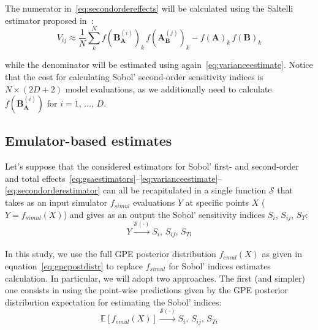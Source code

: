 \noindent
The numerator in~\eqref{eq:secondordereffects} will be calculated using the Saltelli estimator proposed in~\cite{Saltelli:2002}:
%
\begin{equation}\label{eq:secondorderestimator}
   V_{ij} \approx \frac{1}{N}\sum_{k}^{N}f(\mathbf{B}_{\mathbf{A}}^{(i)})_k\,f(\mathbf{A}_{\mathbf{B}}^{(j)})_k - f(\mathbf{A})_k\,f(\mathbf{B})_k
\end{equation}

\noindent
while the denominator will be estimated using again~\eqref{eq:varianceestimate}. Notice that the cost for calculating Sobol' second-order sensitivity indices is $N\times (2D + 2)$ model evaluations, as we additionally need to calculate $f(\mathbf{B}_{\mathbf{A}}^{(i)})$ for $i=1,\,\dots,\,D$.


%
%
%
\subsection{Emulator-based estimates}\label{sec:ch3emulatorbasedestimates}
Let's suppose that the considered estimators for Sobol' first- and second-order and total effects~\eqref{eq:gsaestimators}--\eqref{eq:varianceestimate}--\eqref{eq:secondorderestimator} can all be recapitulated in a single function $\mathcal{S}$ that takes as an input simulator $f_{simul}$ evaluations $Y$ at specific points $X$ ($Y=f_{simul}(X)$) and gives as an output the Sobol' sensitivity indices $S_i,\,S_{ij},\,S_{T}$:
%
\begin{equation}\label{eq:modelevalsgsa}
    Y\xrightarrow[]{\mathcal{S}(\cdot)} S_i,\,S_{ij},\,S_{Ti}
\end{equation}

\noindent
In this study, we use the full GPE posterior distribution $f_{emul}(X)$ as given in equation~\eqref{eq:gpepostdistr} to replace $f_{simul}$ for Sobol' indices estimates calculation. In particular, we will adopt two approaches. The first (and simpler) one consists in using the point-wise predictions given by the GPE posterior distribution expectation for estimating the Sobol' indices:
%
\begin{equation}\label{eq:emulmeangsa}
    \mathbb{E}[f_{emul}(X)]\xrightarrow[]{\mathcal{S}(\cdot)} S_i,\,S_{ij},\,S_{Ti}
\end{equation}

